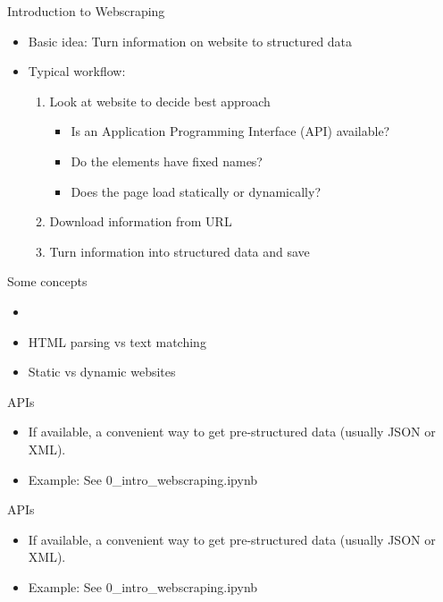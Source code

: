 \begin{frame}{Introduction to Webscraping}
\begin{itemize}
	\item Basic idea: Turn information on website to structured data
	\item Typical workflow:
	\begin{enumerate}
		\item Look at website to decide best approach
		\begin{itemize}
			\item Is an Application Programming Interface (API) available?
			\item Do the elements have fixed names?
			\item Does the page load statically or dynamically?
		\end{itemize}
		\item Download information from URL
		\item Turn information into structured data and save
	\end{enumerate}
\end{itemize}
\end{frame}

\begin{frame}{Some concepts}
\begin{itemize}
	\item 
	\item HTML parsing vs text matching
	\item Static vs dynamic websites
\end{itemize}
\end{frame}

\begin{frame}{APIs}
\begin{itemize}
	\item If available, a convenient way to get pre-structured data (usually JSON or XML).
	\item Example: See 0_intro_webscraping.ipynb
\end{itemize}
\end{frame}

\begin{frame}{APIs}
\begin{itemize}
	\item If available, a convenient way to get pre-structured data (usually JSON or XML).
	\item Example: See 0_intro_webscraping.ipynb
\end{itemize}
\end{frame}

